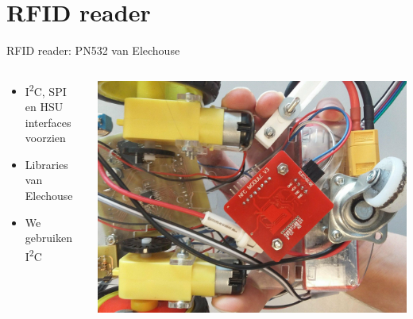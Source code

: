 \documentclass[t,12pt,english
\ifx\beamermode\undefined\else,\beamermode\fi
]{beamer}
\begin{document}
\section{RFID reader}
\begin{frame}{RFID reader: PN532 van Elechouse}
\begin{columns}
	\begin{column}{0.5\textwidth}
		\begin{itemize}
			\item[] I\textsuperscript{2}C, SPI en HSU interfaces voorzien
			\item[] Libraries van Elechouse
			\item[] We gebruiken I\textsuperscript{2}C
		\end{itemize}
	\end{column}
	\begin{column}{0.5\textwidth}  
		\begin{center}
			\includegraphics[width=\textwidth,height=0.7\textheight,keepaspectratio]{rfidlezermontage.png}
		\end{center}
	\end{column}
\end{columns} 
\end{frame}

\end{document}
